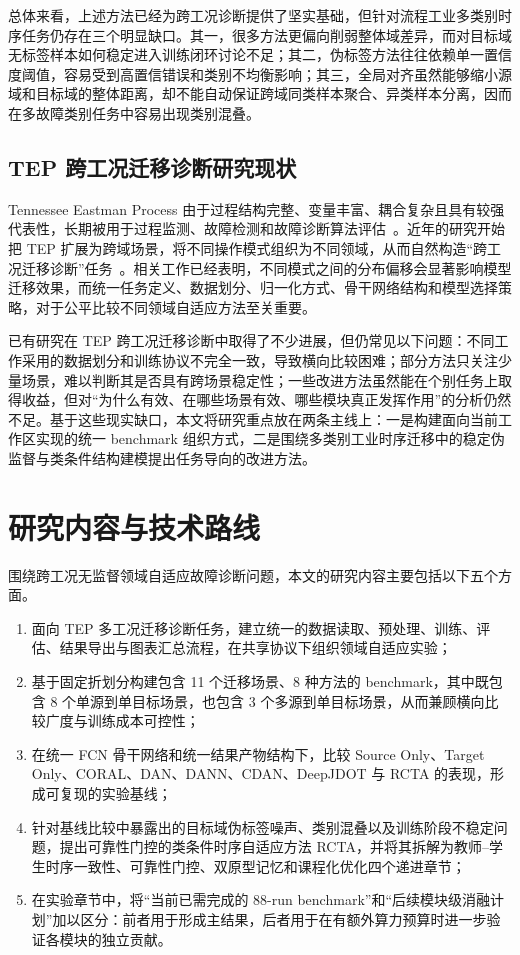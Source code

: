 总体来看，上述方法已经为跨工况诊断提供了坚实基础，但针对流程工业多类别时序任务仍存在三个明显缺口。其一，很多方法更偏向削弱整体域差异，而对目标域无标签样本如何稳定进入训练闭环讨论不足；其二，伪标签方法往往依赖单一置信度阈值，容易受到高置信错误和类别不均衡影响；其三，全局对齐虽然能够缩小源域和目标域的整体距离，却不能自动保证跨域同类样本聚合、异类样本分离，因而在多故障类别任务中容易出现类别混叠。

\subsection{TEP 跨工况迁移诊断研究现状}
Tennessee Eastman Process 由于过程结构完整、变量丰富、耦合复杂且具有较强代表性，长期被用于过程监测、故障检测和故障诊断算法评估~\cite{downs1993plant}。近年的研究开始把 TEP 扩展为跨域场景，将不同操作模式组织为不同领域，从而自然构造“跨工况迁移诊断”任务~\cite{montesuma2023benchmark,wu2020transfer,qin2023dynamic}。相关工作已经表明，不同模式之间的分布偏移会显著影响模型迁移效果，而统一任务定义、数据划分、归一化方式、骨干网络结构和模型选择策略，对于公平比较不同领域自适应方法至关重要。

已有研究在 TEP 跨工况迁移诊断中取得了不少进展，但仍常见以下问题：不同工作采用的数据划分和训练协议不完全一致，导致横向比较困难；部分方法只关注少量场景，难以判断其是否具有跨场景稳定性；一些改进方法虽然能在个别任务上取得收益，但对“为什么有效、在哪些场景有效、哪些模块真正发挥作用”的分析仍然不足。基于这些现实缺口，本文将研究重点放在两条主线上：一是构建面向当前工作区实现的统一 benchmark 组织方式，二是围绕多类别工业时序迁移中的稳定伪监督与类条件结构建模提出任务导向的改进方法。

\section{研究内容与技术路线}
围绕跨工况无监督领域自适应故障诊断问题，本文的研究内容主要包括以下五个方面。

\begin{enumerate}
\item 面向 TEP 多工况迁移诊断任务，建立统一的数据读取、预处理、训练、评估、结果导出与图表汇总流程，在共享协议下组织领域自适应实验；
\item 基于固定折划分构建包含 11 个迁移场景、8 种方法的 benchmark，其中既包含 8 个单源到单目标场景，也包含 3 个多源到单目标场景，从而兼顾横向比较广度与训练成本可控性；
\item 在统一 FCN 骨干网络和统一结果产物结构下，比较 Source Only、Target Only、CORAL、DAN、DANN、CDAN、DeepJDOT 与 RCTA 的表现，形成可复现的实验基线；
\item 针对基线比较中暴露出的目标域伪标签噪声、类别混叠以及训练阶段不稳定问题，提出可靠性门控的类条件时序自适应方法 RCTA，并将其拆解为教师--学生时序一致性、可靠性门控、双原型记忆和课程化优化四个递进章节；
\item 在实验章节中，将“当前已需完成的 88-run benchmark”和“后续模块级消融计划”加以区分：前者用于形成主结果，后者用于在有额外算力预算时进一步验证各模块的独立贡献。
\end{enumerate}

